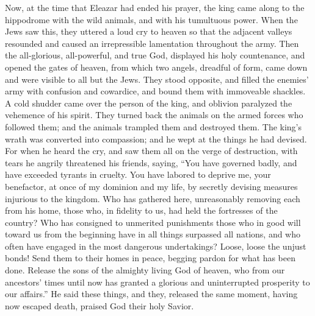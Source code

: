  Now, at the time that Eleazar had ended his prayer, the
king came along to the hippodrome with the wild animals, and with his
tumultuous power.  When the Jews saw this, they uttered a
loud cry to heaven so that the adjacent valleys resounded and caused an
irrepressible lamentation throughout the army.  Then the
all-glorious, all-powerful, and true God, displayed his holy
countenance, and opened the gates of heaven, from which two angels,
dreadful of form, came down and were visible to all but the Jews.
 They stood opposite, and filled the enemies' army with
confusion and cowardice, and bound them with immoveable shackles.
 A cold shudder came over the person of the king, and
oblivion paralyzed the vehemence of his spirit.  They
turned back the animals on the armed forces who followed them; and the
animals trampled them and destroyed them.  The king's wrath
was converted into compassion; and he wept at the things he had devised.
 For when he heard the cry, and saw them all on the verge
of destruction, with tears he angrily threatened his friends, saying,
 ``You have governed badly, and have exceeded tyrants in
cruelty. You have labored to deprive me, your benefactor, at once of my
dominion and my life, by secretly devising measures injurious to the
kingdom.  Who has gathered here, unreasonably removing each
from his home, those who, in fidelity to us, had held the fortresses of
the country?  Who has consigned to unmerited punishments
those who in good will toward us from the beginning have in all things
surpassed all nations, and who often have engaged in the most dangerous
undertakings?  Loose, loose the unjust bonds! Send them to
their homes in peace, begging pardon for what has been done.
 Release the sons of the almighty living God of heaven, who
from our ancestors' times until now has granted a glorious and
uninterrupted prosperity to our affairs.''  He said these
things, and they, released the same moment, having now escaped death,
praised God their holy Savior.

